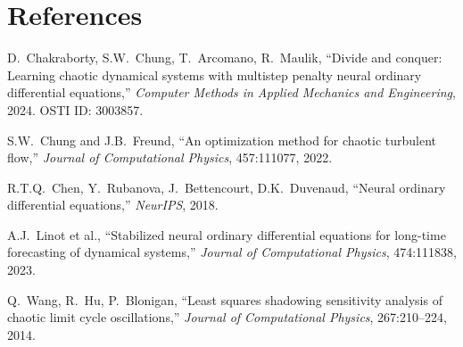 \documentclass[11pt]{article}
\begin{document}
\section*{References}

\begin{enumerate}[leftmargin=*,label={[\arabic*]}]
    \item D.\ Chakraborty, S.W.\ Chung, T.\ Arcomano, R.\ Maulik, ``Divide and conquer: Learning chaotic dynamical systems with multistep penalty neural ordinary differential equations,'' \textit{Computer Methods in Applied Mechanics and Engineering}, 2024. OSTI ID: 3003857.
    \item S.W.\ Chung and J.B.\ Freund, ``An optimization method for chaotic turbulent flow,'' \textit{Journal of Computational Physics}, 457:111077, 2022.
    \item R.T.Q.\ Chen, Y.\ Rubanova, J.\ Bettencourt, D.K.\ Duvenaud, ``Neural ordinary differential equations,'' \textit{NeurIPS}, 2018.
    \item A.J.\ Linot et al., ``Stabilized neural ordinary differential equations for long-time forecasting of dynamical systems,'' \textit{Journal of Computational Physics}, 474:111838, 2023.
    \item Q.\ Wang, R.\ Hu, P.\ Blonigan, ``Least squares shadowing sensitivity analysis of chaotic limit cycle oscillations,'' \textit{Journal of Computational Physics}, 267:210--224, 2014.
\end{enumerate}
\end{document}
